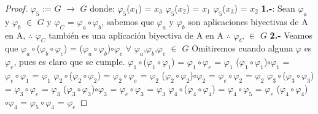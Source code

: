 \documentclass[10pt,a4paper,oneside]{article}
\begin{document}
\begin{proof}
				$\varphi_{5}$ := $G$ $\rightarrow$ $G$ donde:
				\newline
				$\varphi_{5}$($x_{1}$) = $x_{3}$
				\newline
				$\varphi_{5}$($x_{2}$) = $x_{1}$
				\newline
				$\varphi_{5}$($x_{3}$) = $x_{2}$
				\newline
				\newline
				\textbf{1.-}:
				Sean $\varphi_{a}$ y  $\varphi_{b}$ $\in$ $G$ y $\varphi_{C}$ = $\varphi_{a}\circ\varphi_{b}$, sabemos que $\varphi_{a}$ y $\varphi_{b}$ son aplicaciones biyectivas de A en A, $\therefore$ $\varphi_{C}$ también es una aplicación biyectiva de A en A $\therefore$ $\varphi_{C}$ $\in$ $G$
				\newline
				\newline
				\textbf{2.-}
				Veamos que $\varphi_{a}\circ$($\varphi_{b}\circ\varphi_{c}$) = ($\varphi_{a}\circ\varphi_{b}$)$\circ\varphi_{c}$ $\forall$ $\varphi_{a}$,$\varphi_{b}$,$\varphi_{c}$ $\in$ $G$
				\newline
				Omitiremos cuando alguna $\varphi$ es $\varphi_{e}$, pues es claro que se cumple.
				\newline
				$\varphi_{1}\circ$($\varphi_{1}\circ\varphi_{1}$) = $\varphi_{1}\circ\varphi_{e}$ = $\varphi_{1}$
				\newline
				($\varphi_{1}\circ\varphi_{1}$)$\circ\varphi_{1}$ = $\varphi_{e}\circ\varphi_{1}$ = $\varphi_{1}$
				\newline
				\newline
				$\varphi_{2}\circ$($\varphi_{2}\circ\varphi_{2}$) = $\varphi_{2}\circ\varphi_{e}$ = $\varphi_{2}$
				\newline
				($\varphi_{2}\circ\varphi_{2}$)$\circ\varphi_{2}$ = $\varphi_{e}\circ\varphi_{2}$ = $\varphi_{2}$
				\newline
				\newline
				$\varphi_{3}\circ$($\varphi_{3}\circ\varphi_{3}$) = $\varphi_{3}\circ\varphi_{e}$ = $\varphi_{3}$
				\newline
				($\varphi_{3}\circ\varphi_{3}$)$\circ\varphi_{3}$ = $\varphi_{e}\circ\varphi_{3}$ = $\varphi_{3}$
				\newline
				\newline
				$\varphi_{4}\circ$($\varphi_{4}\circ\varphi_{4}$) = $\varphi_{4}\circ\varphi_{5}$ = $\varphi_{e}$
				\newline
				($\varphi_{4}\circ\varphi_{4}$)$\circ\varphi_{4}$ = $\varphi_{5}\circ\varphi_{4}$ = $\varphi_{e}$
				\newline

\end{proof}
\end{document}
